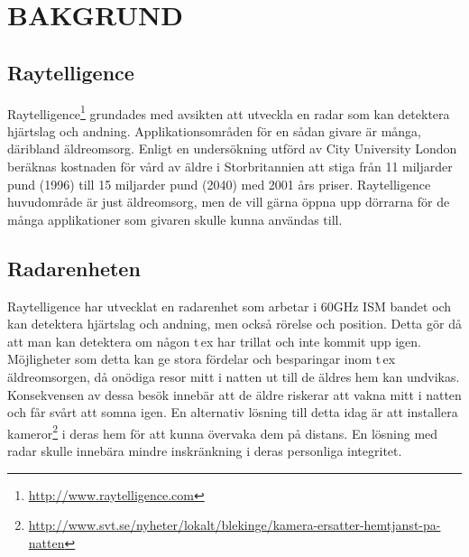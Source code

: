 \chapter{BAKGRUND}
\thispagestyle{fancy}

\section{Raytelligence}
Raytelligence\footnote{\url{http://www.raytelligence.com}} grundades med avsikten att utveckla en radar som kan detektera hjärtslag och andning. Applikationsområden för en sådan givare är många, däribland äldreomsorg. Enligt en undersökning utförd av City University London\cite{elderly_cost} beräknas kostnaden för vård av äldre i Storbritannien att stiga från 11 miljarder pund (1996) till 15 miljarder pund (2040) med 2001 års priser. Raytelligence huvudområde är just äldreomsorg, men de vill gärna öppna upp dörrarna för de många applikationer som givaren skulle kunna användas till. 

\section{Radarenheten}
Raytelligence har utvecklat en radarenhet som arbetar i 60GHz \acs{ISM} bandet och kan detektera hjärtslag och andning, men också rörelse och position. Detta gör då att man kan detektera om någon t\,ex har trillat och inte kommit upp igen. Möjligheter som detta kan ge stora fördelar och besparingar inom t\,ex äldreomsorgen, då onödiga resor mitt i natten ut till de äldres hem kan undvikas. Konsekvensen av dessa besök innebär att de äldre riskerar att vakna mitt i natten och får svårt att somna igen. En alternativ lösning till detta idag är att installera kameror\footnote{\url{http://www.svt.se/nyheter/lokalt/blekinge/kamera-ersatter-hemtjanst-pa-natten}} i deras hem för att kunna övervaka dem på distans. En lösning med radar skulle innebära mindre inskränkning i deras personliga integritet.
